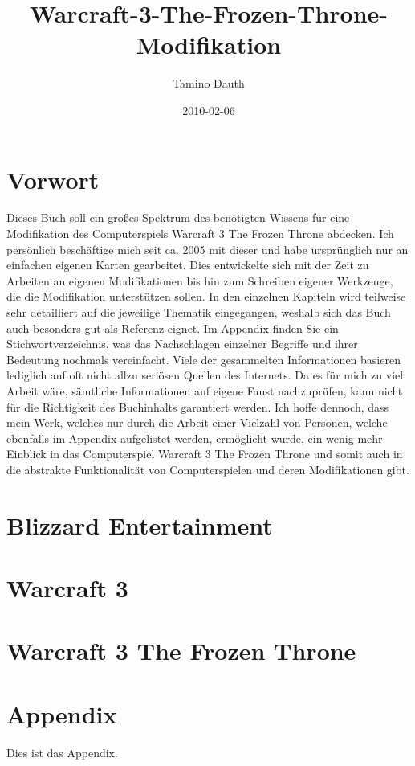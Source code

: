 \documentclass[12pt,german,a5paper,twoside,titlepage,openright,onecolumn]{book}
\begin{document}
	\title{Warcraft-3-The-Frozen-Throne-Modifikation}
	\author{Tamino Dauth}
	\date{2010-02-06}
	\maketitle

	\chapter{Vorwort}
	Dieses Buch soll ein großes Spektrum des benötigten Wissens für eine Modifikation des Computerspiels Warcraft 3 The Frozen Throne abdecken. Ich persönlich beschäftige mich seit ca. 2005 mit dieser und habe ursprünglich nur an einfachen eigenen Karten gearbeitet. Dies entwickelte sich mit der Zeit zu Arbeiten an eigenen Modifikationen bis hin zum Schreiben eigener Werkzeuge, die die Modifikation unterstützen sollen.
	In den einzelnen Kapiteln wird teilweise sehr detailliert auf die jeweilige Thematik eingegangen, weshalb sich das Buch auch besonders gut als Referenz eignet.
	Im Appendix finden Sie ein Stichwortverzeichnis, was das Nachschlagen einzelner Begriffe und ihrer Bedeutung nochmals vereinfacht.
	Viele der gesammelten Informationen basieren lediglich auf oft nicht allzu seriösen Quellen des Internets. Da es für mich zu viel Arbeit wäre, sämtliche Informationen auf eigene Faust nachzuprüfen, kann nicht für die Richtigkeit des Buchinhalts garantiert werden.
	Ich hoffe dennoch, dass mein Werk, welches nur durch die Arbeit einer Vielzahl von Personen, welche ebenfalls im Appendix aufgelistet werden, ermöglicht wurde, ein wenig mehr Einblick in das Computerspiel Warcraft 3 The Frozen Throne und somit auch in die abstrakte Funktionalität von Computerspielen und deren Modifikationen gibt.

	\chapter{Blizzard Entertainment}

	\chapter{Warcraft 3}

	\chapter{Warcraft 3 The Frozen Throne}

	
	
	

	\appendix
	\chapter{Appendix}
	Dies ist das Appendix.
\end{document}

